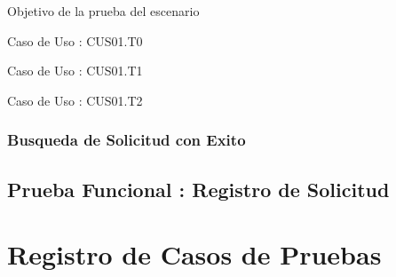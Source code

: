 Objetivo de la prueba del escenario

Caso de Uso : CUS01.T0

Caso de Uso : CUS01.T1

Caso de Uso : CUS01.T2

\subsubsection {Busqueda de Solicitud con Exito}



\subsection{Prueba Funcional : Registro de Solicitud}

\section{Registro de Casos de Pruebas}
